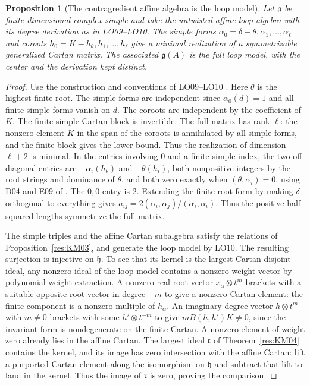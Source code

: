 \documentclass[11pt,oneside,openany]{book}
\newtheorem{proposition}[theorem]{Proposition}
\theoremstyle{definition}
\theoremstyle{remark}
\begin{document}
\begin{proposition}[The contragredient affine algebra is the loop model]
\label{res:KM09}
Let \(\mathfrak a\) be finite-dimensional complex simple and take
the untwisted affine loop algebra with its degree derivation
as in LO09--LO10. The simple forms
\(\alpha_0=\delta-\theta,\alpha_1,\ldots,\alpha_\ell\) and
coroots \(h_0=K-h_\theta,h_1,\ldots,h_\ell\) give a
minimal realization of a symmetrizable generalized Cartan
matrix. The associated \(\mathfrak g(A)\) is the full loop
model, with the center and the derivation kept distinct.
\end{proposition}

\begin{proof}
Use the construction and conventions of LO09--LO10
\cite[PDF p.~26]{mg-reptopics}. Here \(\theta\) is the highest
finite root. The simple forms are independent since
\(\alpha_0(d)=1\) and all finite simple forms vanish on \(d\).
The coroots are independent by the coefficient of \(K\).
The finite simple Cartan block is invertible. The full matrix
has rank \(\ell\): the nonzero element \(K\) in the span of the
coroots is annihilated by all simple forms, and the finite block
gives the lower bound. Thus the realization of dimension
\(\ell+2\) is minimal. In the entries involving \(0\) and a
finite simple index, the two off-diagonal entries are
\(-\alpha_i(h_\theta)\) and \(-\theta(h_i)\), both nonpositive
integers by the root strings and dominance of \(\theta\), and
both zero exactly when \((\theta,\alpha_i)=0\), using D04 and
E09 of \cite[PDF pp.~24--25, 34--35]{mg-lie}.
The \(0,0\) entry is \(2\). Extending the finite root form
by making \(\delta\) orthogonal to everything gives
\(a_{ij}=2(\alpha_i,\alpha_j)/(\alpha_i,\alpha_i)\).
Thus the positive half-squared lengths symmetrize the full matrix.

The simple triples and the affine Cartan subalgebra satisfy the
relations of Proposition~\ref{res:KM03}, and generate the loop
model by LO10. The resulting surjection is injective on
\(\mathfrak h\). To see that its kernel is the largest
Cartan-disjoint ideal, any nonzero ideal of the loop model
contains a nonzero weight vector by polynomial weight
extraction. A nonzero real root vector
\(x_\alpha\otimes t^m\) brackets with a suitable opposite
root vector in degree \(-m\) to give a nonzero Cartan
element: the finite component is a nonzero multiple of
\(h_\alpha\). An imaginary degree vector
\(h\otimes t^m\) with \(m\ne0\) brackets with some
\(h'\otimes t^{-m}\) to give
\(m B(h,h')K\ne0\), since the invariant form is nondegenerate
on the finite Cartan. A nonzero element of weight zero
already lies in the affine Cartan. The largest ideal
\(\mathfrak r\) of Theorem~\ref{res:KM04} contains the kernel,
and its image has zero intersection with the affine Cartan:
lift a purported Cartan element along the isomorphism on
\(\mathfrak h\) and subtract that lift to land in the
kernel. Thus the image of \(\mathfrak r\) is zero, proving
the comparison.
\end{proof}
\end{document}
